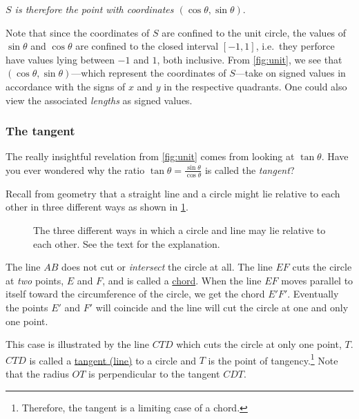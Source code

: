 \documentclass[
  a4paper,
]{article}
\begin{document}
\emph{\(S\) is therefore the point with coordinates
\((\cos\theta, \sin\theta)\)}.

Note that since the coordinates of \(S\) are confined to the unit
circle, the values of \(\sin\theta\) and \(\cos\theta\) are confined to
the closed interval \([-1, 1]\), i.e.~they perforce have values lying
between \(-1\) and \(1\), both inclusive. From \cref{fig:unit}, we see
that \((\cos\theta, \sin\theta)\)---which represent the coordinates of
\(S\)---take on signed values in accordance with the signs of \(x\) and
\(y\) in the respective quadrants. One could also view the associated
\emph{lengths} as signed values.

\hypertarget{the-tangent}{%
\subsubsection{The tangent}\label{the-tangent}}

The really insightful revelation from \cref{fig:unit} comes from looking
at \(\tan\theta\). Have you ever wondered why the ratio
\(\tan\theta = \frac{\sin\theta}{\cos\theta}\) is called the
\emph{tangent}?

Recall from geometry that a straight line and a circle might lie
relative to each other in three different ways as shown in
\cref{fig:chord-tangent}.

\begin{figure}
\hypertarget{fig:chord-tangent}{%
\centering

\caption{The three different ways in which a circle and line may lie
relative to each other. See the text for the
explanation.}\label{fig:chord-tangent}
}
\end{figure}

The line \(AB\) does not cut or \emph{intersect} the circle at all. The
line \(EF\) cuts the circle at \emph{two} points, \(E\) and \(F\), and
is called a
\href{https://en.wikipedia.org/wiki/Chord_(geometry)}{chord}. When the
line \(EF\) moves parallel to itself toward the circumference of the
circle, we get the chord \(E'F'\). Eventually the points \(E'\) and
\(F'\) will coincide and the line will cut the circle at one and only
one point.

This case is illustrated by the line \(CTD\) which cuts the circle at
only one point, \(T\). \(CTD\) is called a
\href{https://en.wikipedia.org/wiki/Tangent_lines_to_circles}{tangent
(line)} to a circle and \(T\) is the point of tangency.\footnote{Therefore,
  the tangent is a limiting case of a chord.} Note that the radius
\(OT\) is perpendicular to the tangent \(CDT\).
\end{document}
